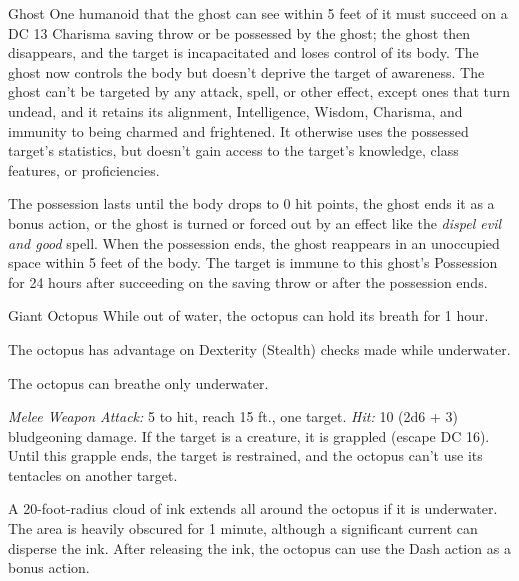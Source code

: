\documentclass[10pt,a4paper,twoside,bg=print,twocolumn,openany,nodeprecatedcode]{dndbook}
\begin{document}
\begin{DndMonster}[float=t]{Ghost}
One humanoid that the ghost can see within 5 feet of it must succeed on a DC 13 Charisma saving throw or be possessed by the ghost; the ghost then disappears, and the target is incapacitated and loses control of its body. The ghost now controls the body but doesn't deprive the target of awareness. The ghost can't be targeted by any attack, spell, or other effect, except ones that turn undead, and it retains its alignment, Intelligence, Wisdom, Charisma, and immunity to being charmed and frightened. It otherwise uses the possessed target's statistics, but doesn't gain access to the target's knowledge, class features, or proficiencies.

The possession lasts until the body drops to 0 hit points, the ghost ends it as a bonus action, or the ghost is turned or forced out by an effect like the \textit{dispel evil and good} spell. When the possession ends, the ghost reappears in an unoccupied space within 5 feet of the body. The target is immune to this ghost's Possession for 24 hours after succeeding on the saving throw or after the possession ends.

\end{DndMonster}



\begin{DndMonster}[float=t]{Giant Octopus}
\DndMonsterBasics[
armor-class = {11},
hit-points = {\DndDice{8d10 + 8}},
speed = {10 ft., swim 60 ft.}
]
\DndMonsterAbilityScores[
 str = 17,
 dex = 13,
 con = 13,
 int = 4,
 wis = 10,
 cha = 4
]
\DndMonsterDetails[
skills = {Perception +4, Stealth +5},
senses = {darkvision 60 ft., passive perception 14},
challenge = 1,
]
While out of water, the octopus can hold its breath for 1 hour.

The octopus has advantage on Dexterity (Stealth) checks made while underwater.

The octopus can breathe only underwater.

\textsl{Melee Weapon Attack:} 5 to hit, reach 15 ft., one target. \textsl{Hit:} 10 (2d6 + 3) bludgeoning damage. If the target is a creature, it is grappled (escape DC 16). Until this grapple ends, the target is restrained, and the octopus can't use its tentacles on another target.

A 20-foot-radius cloud of ink extends all around the octopus if it is underwater. The area is heavily obscured for 1 minute, although a significant current can disperse the ink. After releasing the ink, the octopus can use the Dash action as a bonus action.

\end{DndMonster}
\end{document}
